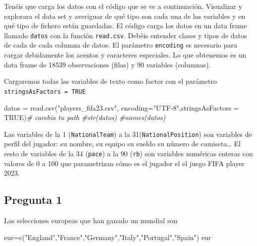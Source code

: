 \documentclass[
]{article}
\newenvironment{Shaded}{\begin{snugshade}}{\end{snugshade}}
\newcommand{\AttributeTok}[1]{\textcolor[rgb]{0.77,0.63,0.00}{#1}}
\newcommand{\CommentTok}[1]{\textcolor[rgb]{0.56,0.35,0.01}{\textit{#1}}}
\newcommand{\ConstantTok}[1]{\textcolor[rgb]{0.00,0.00,0.00}{#1}}
\newcommand{\FunctionTok}[1]{\textcolor[rgb]{0.00,0.00,0.00}{#1}}
\newcommand{\NormalTok}[1]{#1}
\newcommand{\OtherTok}[1]{\textcolor[rgb]{0.56,0.35,0.01}{#1}}
\newcommand{\StringTok}[1]{\textcolor[rgb]{0.31,0.60,0.02}{#1}}
\begin{document}
Tenéis que carga los datos con el código que se ve a continuación.
Visualizar y explorara el data set y averiguar de qué tipo son cada una
de las variables y en qué tipo de fichero están guardadas. El código
carga los datos en un data frame llamado \texttt{datos} con la función
\texttt{read.csv}. Debéis entender clases y tipos de datos de cada de
cada columna de datos. El parámetro \texttt{encoding} es necesario para
cargar debidamente los acentos y caracteres especiales. Lo que obtenemos
es un data frame de 18539 observaciones (filas) y 90 variables
(columnas).

Cargaremos todas las variables de texto como factor con el parámetro
\texttt{stringsAsFactors\ =\ TRUE}

\begin{Shaded}
\begin{Highlighting}[]
\NormalTok{datos }\OtherTok{=} \FunctionTok{read.csv}\NormalTok{(}\StringTok{"players\_fifa23.csv"}\NormalTok{,}
  \AttributeTok{encoding=}\StringTok{"UTF{-}8"}\NormalTok{,}\AttributeTok{stringsAsFactors =} \ConstantTok{TRUE}\NormalTok{)}\CommentTok{\# cambia tu path}
\CommentTok{\#str(datos)}
\CommentTok{\#names(datos)}
\end{Highlighting}
\end{Shaded}

Las variables de la 1 (\texttt{NationalTeam}) a la
31(\texttt{NationalPosition}) son variables de perfil del jugador: su
nombre, su equipo su sueldo su número de camiseta\ldots{} El resto de
variables de la 34 (\texttt{pace}) a la 90 (\texttt{rb}) son variables
numéricas enteras con valores de 0 a 100 que parametrizan cómo es el
jugador el el juego FIFA player 2023.

\hypertarget{pregunta-1}{%
\subsection{Pregunta 1}\label{pregunta-1}}

Las selecciones europeas que han ganado un mundial son

\begin{Shaded}
\begin{Highlighting}[]
\NormalTok{eur}\OtherTok{=}\FunctionTok{c}\NormalTok{(}\StringTok{"England"}\NormalTok{,}\StringTok{"France"}\NormalTok{,}\StringTok{"Germany"}\NormalTok{,}\StringTok{"Italy"}\NormalTok{,}\StringTok{"Portugal"}\NormalTok{,}\StringTok{"Spain"}\NormalTok{)}
\NormalTok{eur}
\end{Highlighting}
\end{Shaded}
\end{document}
